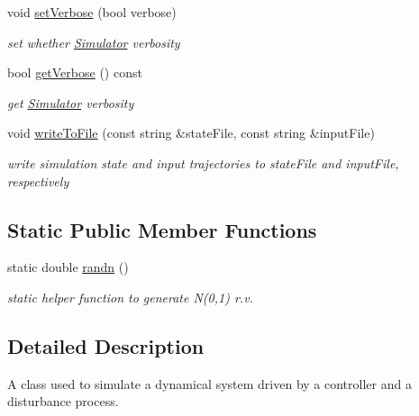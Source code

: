 \begin{DoxyCompactItemize}
\mbox{\label{classSimulator_a1b7d632e3a3552977c029cf2ec9ffe6d}} 
void \mbox{\hyperlink{classSimulator_a1b7d632e3a3552977c029cf2ec9ffe6d}{set\+Verbose}} (bool verbose)
\begin{DoxyCompactList}\small\item\em set whether \mbox{\hyperlink{classSimulator}{Simulator}} verbosity \end{DoxyCompactList}\item 
\mbox{\label{classSimulator_afa7f3ae7bb179cd053370ba916888951}} 
bool \mbox{\hyperlink{classSimulator_afa7f3ae7bb179cd053370ba916888951}{get\+Verbose}} () const
\begin{DoxyCompactList}\small\item\em get \mbox{\hyperlink{classSimulator}{Simulator}} verbosity \end{DoxyCompactList}\item 
\mbox{\label{classSimulator_a04c16ab9b54382c4e87a467d818ef24b}} 
void \mbox{\hyperlink{classSimulator_a04c16ab9b54382c4e87a467d818ef24b}{write\+To\+File}} (const string \&state\+File, const string \&input\+File)
\begin{DoxyCompactList}\small\item\em write simulation state and input trajectories to state\+File and input\+File, respectively \end{DoxyCompactList}\end{DoxyCompactItemize}
\subsection*{Static Public Member Functions}
\begin{DoxyCompactItemize}
\item 
\mbox{\label{classSimulator_a91551e262a87157d9d523d5332bd2a58}} 
static double \mbox{\hyperlink{classSimulator_a91551e262a87157d9d523d5332bd2a58}{randn}} ()
\begin{DoxyCompactList}\small\item\em static helper function to generate N(0,1) r.\+v. \end{DoxyCompactList}\end{DoxyCompactItemize}


\subsection{Detailed Description}
A class used to simulate a dynamical system driven by a controller and a disturbance process. 

